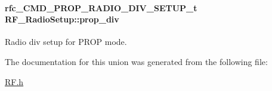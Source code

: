 \paragraph[{prop\+\_\+div}]{\setlength{\rightskip}{0pt plus 5cm}rfc\+\_\+\+C\+M\+D\+\_\+\+P\+R\+O\+P\+\_\+\+R\+A\+D\+I\+O\+\_\+\+D\+I\+V\+\_\+\+S\+E\+T\+U\+P\+\_\+t R\+F\+\_\+\+Radio\+Setup\+::prop\+\_\+div}\label{union_r_f___radio_setup_ae5b63db8408d7cd3cc773f7c38ea0545}


Radio div setup for P\+R\+O\+P mode. 



The documentation for this union was generated from the following file\+:\begin{DoxyCompactItemize}
\item 
\hyperlink{_r_f_8h}{R\+F.\+h}\end{DoxyCompactItemize}

